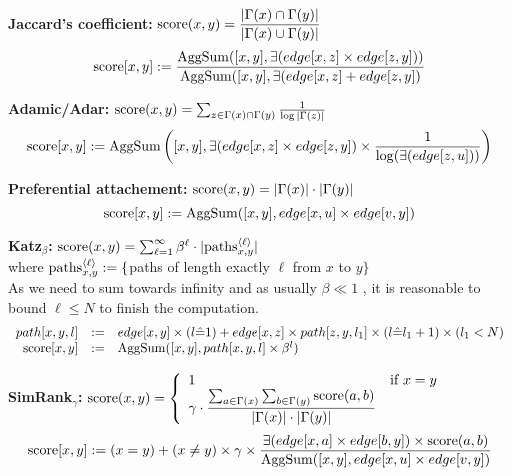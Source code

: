 \documentclass[10pt]{article}
\begin{document}
{\bf Jaccard's coefficient:} ${\rm score}(x,y)=\dfrac{|\Gamma(x) \cap \Gamma(y)|}{|\Gamma(x) \cup \Gamma(y)|}$
\[{\rm score}[x,y] := \dfrac{{\rm AggSum}([x,y], \exists(edge[x,z] \times edge[z,y]))}
					{{\rm AggSum}([x,y], \exists(edge[x,z] + edge[z,y])}\]

{\bf Adamic/Adar:} ${\rm score}(x,y)=\sum_{z\in \Gamma(x) \cap \Gamma(y)}\frac{1}{\log|\Gamma(z)|}$
\[{\rm score}[x,y] := {\rm AggSum}\left([x,y], \exists(edge[x,z]\times edge[z,y])  \times \dfrac{1}{\log(\exists(edge[z,u]))}\right)\]

{\bf Preferential attachement:} ${\rm score}(x,y)=|\Gamma(x)| \cdot |\Gamma(y)|$
\[{\rm score}[x,y] := {\rm AggSum}([x,y], edge[x,u] \times edge[v,y])\]

{\bf Katz${}_{\beta}$:} ${\rm score}(x,y)=\sum_{\ell=1}^{\infty} \beta^\ell \cdot |{\rm paths}_{x,y}^{\langle\ell\rangle}|$ \\where ${\rm paths}_{x,y}^{\langle\ell\rangle} := \{$paths of length exactly $\ell$ from $x$ to $y\}$\\
As we need to sum towards infinity and as usually $\beta \ll 1$ \cite{linkpred}, it is reasonable to bound $\ell \le N$ to finish the computation.
\[\begin{array}{rcl}
path[x,y,l] &:=& edge[x,y] \times (l\hat=1) +  edge[x,z] \times path[z,y,l_1] \times (l\hat= l_1+1) \times (l_1<N)\\
{\rm score}[x,y] &:=& {\rm AggSum}([x,y], path[x,y,l] \times \beta^l )
\end{array}\]

{\bf SimRank${}_\gamma$:} ${\rm score}(x,y)=\left\{\begin{array}{ll}1&\text{if }x=y\\
	\gamma\cdot\dfrac{\sum_{a\in\Gamma(x)}\sum_{b\in\Gamma(y)} {\rm score}(a,b)}
		{|\Gamma(x)| \cdot |\Gamma(y)|} \end{array}\right.$
\[{\rm score}[x,y] := (x=y) + (x\ne y) \times\gamma\times\dfrac
	{\exists(edge[x,a] \times edge[b,y]) \times {\rm score}(a,b)}
	{{\rm AggSum}([x,y], edge[x,u] \times edge[v,y])}\]

\end{document}
